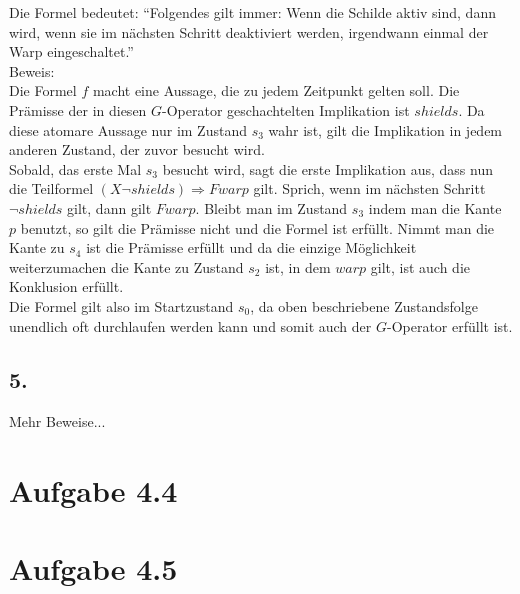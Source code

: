 \documentclass[12pt, paper=a4]{article}
\begin{document}
Die Formel bedeutet: ``Folgendes gilt immer: Wenn die Schilde aktiv sind, dann wird, wenn sie im nächsten Schritt deaktiviert werden, irgendwann einmal der Warp eingeschaltet.''\\

Beweis:\\
Die Formel $f$ macht eine Aussage, die zu jedem Zeitpunkt gelten soll. Die Prämisse der in diesen $G$-Operator geschachtelten Implikation ist $shields$. Da diese atomare Aussage nur im Zustand $s_3$ wahr ist, gilt die Implikation in jedem anderen Zustand, der zuvor besucht wird.\\
Sobald, das erste Mal $s_3$ besucht wird, sagt die erste Implikation aus, dass nun die Teilformel $(X \neg shields) \Rightarrow F warp$ gilt. Sprich, wenn im nächsten Schritt $\neg shields$ gilt, dann gilt $F warp$. Bleibt man im Zustand $s_3$ indem man die Kante $p$ benutzt, so gilt die Prämisse nicht und die Formel ist erfüllt. Nimmt man die Kante zu $s_4$ ist die Prämisse erfüllt und da die einzige Möglichkeit weiterzumachen die Kante zu Zustand $s_2$ ist, in dem $warp$ gilt, ist auch die Konklusion erfüllt.\\
Die Formel gilt also im Startzustand $s_0$, da oben beschriebene Zustandsfolge unendlich oft durchlaufen werden kann und somit auch der $G$-Operator erfüllt ist.\\

\subsection*{5.}
Mehr Beweise...\\

\section*{Aufgabe 4.4}

\section*{Aufgabe 4.5}
\end{document}
